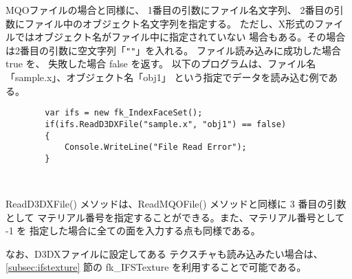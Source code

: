 MQOファイルの場合と同様に、
1番目の引数にファイル名文字列、
2番目の引数にファイル中のオブジェクト名文字列を指定する。
ただし、X形式のファイルではオブジェクト名がファイル中に指定されていない
場合もある。その場合は2番目の引数に空文字列「\verb+""+」を入れる。
ファイル読み込みに成功した場合 true を、
失敗した場合 false を返す。
以下のプログラムは、ファイル名「sample.x」、オブジェクト名「obj1」
という指定でデータを読み込む例である。
\\
\begin{screen}
\begin{verbatim}
        var ifs = new fk_IndexFaceSet();
        if(ifs.ReadD3DXFile("sample.x", "obj1") == false)
        {
            Console.WriteLine("File Read Error");
        }
\end{verbatim}
\end{screen} ~

ReadD3DXFile() メソッドは、ReadMQOFile() メソッドと同様に 3 番目の引数として
マテリアル番号を指定することができる。また、マテリアル番号として -1 を
指定した場合に全ての面を入力する点も同様である。

なお、D3DXファイルに設定してある
テクスチャも読み込みたい場合は、\ref{subsec:ifstexture} 節の
fk\_IFSTexture を利用することで可能である。

